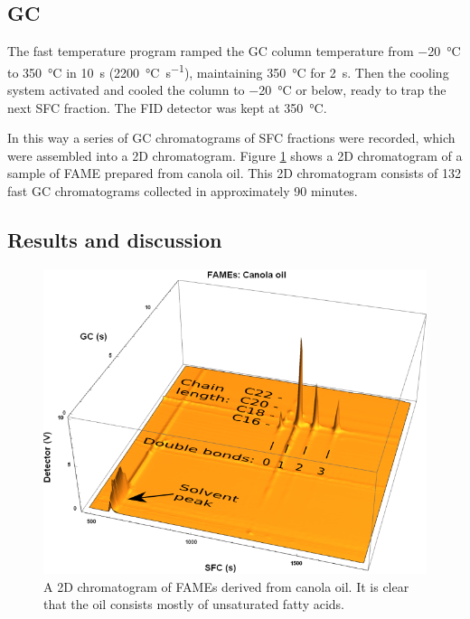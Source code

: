 \subsection{GC}

The fast temperature program ramped the GC column temperature from
\SI{-20}{\celsius} to \SI{350}{\celsius} in \SI{10}{s}
(\SI{2200}{\celsius\per\second}), maintaining \SI{350}{\celsius} for
\SI{2}{\second}. Then the cooling system activated and cooled the column to
\SI{-20}{\celsius} or below, ready to trap the next SFC fraction. The FID
detector was kept at \SI{350}{\celsius}.

In this way a series of GC chromatograms of SFC fractions were recorded, which
were assembled into a 2D chromatogram. Figure \ref{fig:2DCanola} shows
a 2D chromatogram of a sample of FAME prepared from canola oil. This 2D
chromatogram consists of 132 fast GC chromatograms collected in approximately 90
minutes.

\subsection{Results and discussion}

\begin{figure}
\centering
\includegraphics[width=\textwidth]{Figures/Interpretation.png}
\decoRule

\caption[SFC×GC of canola oil]{A 2D chromatogram of FAMEs derived from
canola oil. It is clear that the oil consists mostly of unsaturated fatty
acids.}

\label{fig:2DCanola}
\end{figure}

